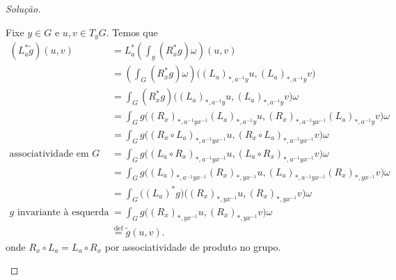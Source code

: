 \begin{proof}[Solução]
\begin{enumerate}[label=(\alph*)]
Fixe \(y \in G\) e \(u,v \in T_yG\). Temos que
\begin{align*}
	(L_a ^*\tilde{g})(u,v)&=L^* _a\left(\int_g(R_x^*g)\omega\right)(u,v)\\
	&=\left(\int_G (R_x^*g)\omega\right)\Big((L_a)_{*,a^{-1}y}u,(L_a)_{*,a^{-1}y}v\Big)\\
	&=\int_G(R_x^* g)\Big((L_a)_{*,a^{-1}y}u,(L_a)_{*,a^{-1}y}v\Big)\omega\\
	&=\int_Gg\Big((R_x)_{*,a^{-1}yx^{-1}}(L_a)_{*,a^{-1}y}u,(R_x)_{*,a^{-1}yx^{-1}}(L_a)_{*,a^{-1}y}v\Big)\omega\\
	&=\int_Gg\Big((R_x \circ L_a)_{*,a^{-1}yx^{-1}}u,(R_x\circ L_a)_{*,a^{-1}yx^{-1}}v\Big)\omega\\
	\text{associatividade em \(G\)} \qquad &=\int_Gg\Big((L_a \circ R_x)_{*,a^{-1}y x^{-1}}u,(L_a \circ R_x)_{*,a^{-1}yx^{-1}}v\Big)\omega\\
	&=\int_Gg\Big((L_a)_{*,a^{-1}yx^{-1}}(R_x)_{*,yx^{-1}}u,(L_a)_{*,a^{-1}yx^{-1}}(R_x)_{*,yx^{-1}}v\Big)\omega\\
	&=\int_G\Big((L_a)^* g\Big)\Big((R_x)_{*,yx^{-1}}u,(R_x)_{*,yx^{-1}}v\Big)\omega\\
\text{\(g\) invariante à esquerda} \qquad 	&=\int_Gg\Big((R_x)_{*,yx^{-1}}u,(R_x)_{*,yx^{-1}}v\Big)\omega\\
	&\overset{\operatorname{def}}{=}\tilde{g}(u,v).
\end{align*}
onde \(R_x \circ L_a=L_a \circ R_x\) por associatividade de produto no grupo.

\end{enumerate}
\end{proof}

